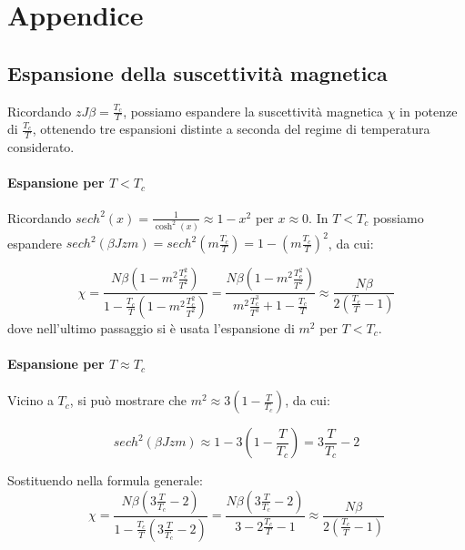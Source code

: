 \section{Appendice}

\subsection{Espansione della suscettività magnetica}\label{appendice:calcolo_suscettivita}

Ricordando $z J \beta = \frac{T_c}{T}$, possiamo espandere la suscettività magnetica $\chi$ in potenze di $\frac{T_c}{T}$, 
ottenendo tre espansioni distinte a seconda del regime di temperatura considerato.

\paragraph{Espansione per $T < T_c$}
Ricordando $sech^2(x)=\frac{1}{\cosh^2(x)} \approx 1 - x^2$ per $x \approx 0$.
In $T<T_c$ possiamo espandere $sech^2(\beta J z m) = sech^2(m \frac{T_c}{T}) = 1 - (m \frac{T_c}{T})^2$, da cui:

\begin{equation}
    \chi = \frac{N \beta (1 - m^2 \frac{T_c^2}{T^2})}{1 - \frac{T_c}{T} (1 - m^2 \frac{T_c^2}{T^2})} = \frac{N \beta (1 - m^2 \frac{T_c^2}{T^2})}{m^2 \frac{T_c^3}{T^3} + 1 - \frac{T_c}{T}} 
    \approx \frac{N \beta}{2\left(\frac{T_c}{T} - 1\right)}
\end{equation}
dove nell'ultimo passaggio si è usata l'espansione di $m^2$ per $T<T_c$.

\paragraph{Espansione per $T \approx T_c$}
Vicino a $T_c$, si può mostrare che $m^2 \approx 3\left(1 - \frac{T}{T_c}\right)$, da cui:

\begin{equation}
    sech^2(\beta J z m) \approx 1 - 3\left(1 - \frac{T}{T_c}\right) = 3\frac{T}{T_c} - 2
\end{equation}

Sostituendo nella formula generale:
\begin{equation}
    \chi = \frac{N\beta\left(3\frac{T}{T_c} - 2\right)}{1 - \frac{T_c}{T}\left(3\frac{T}{T_c} - 2\right)}
    = \frac{N\beta\left(3\frac{T}{T_c} - 2\right)}{3 - 2\frac{T_c}{T} - 1} 
    \approx \frac{N\beta}{2\left(\frac{T_c}{T} - 1\right)}
\end{equation}

